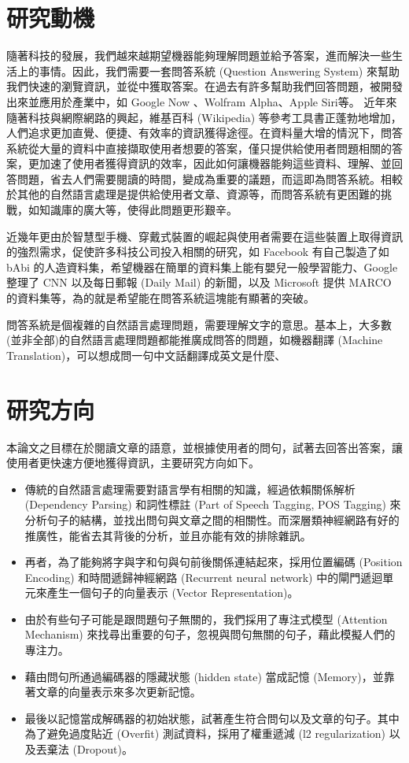 \section{研究動機}
隨著科技的發展，我們越來越期望機器能夠理解問題並給予答案，進而解決一些生活上的事情。因此，我們需要一套問答系統 (Question Answering System) 來幫助我們快速的瀏覽資訊，並從中獲取答案。在過去有許多幫助我們回答問題，被開發出來並應用於產業中，如 Google Now 、Wolfram Alpha、Apple Siri等。
近年來隨著科技與網際網路的興起，維基百科 (Wikipedia) 等參考工具書正蓬勃地增加，人們追求更加直覺、便捷、有效率的資訊獲得途徑。在資料量大增的情況下，問答系統從大量的資料中直接擷取使用者想要的答案，僅只提供給使用者問題相關的答案，更加速了使用者獲得資訊的效率，因此如何讓機器能夠這些資料、理解、並回答問題，省去人們需要閱讀的時間，變成為重要的議題，而這即為問答系統。相較於其他的自然語言處理是提供給使用者文章、資源等，而問答系統有更困難的挑戰，如知識庫的廣大等，使得此問題更形艱辛。

近幾年更由於智慧型手機、穿戴式裝置的崛起與使用者需要在這些裝置上取得資訊的強烈需求，促使許多科技公司投入相關的研究，如 Facebook 有自己製造了如 bAbi 的人造資料集，希望機器在簡單的資料集上能有嬰兒一般學習能力、Google 整理了 CNN 以及每日郵報 (Daily Mail) 的新聞，以及 Microsoft 提供 MARCO 的資料集等，為的就是希望能在問答系統這塊能有顯著的突破。

問答系統是個複雜的自然語言處理問題，需要理解文字的意思。基本上，大多數(並非全部)的自然語言處理問題都能推廣成問答的問題，如機器翻譯 (Machine Translation)，可以想成問一句中文話翻譯成英文是什麼、


\section{研究方向}
本論文之目標在於閱讀文章的語意，並根據使用者的問句，試著去回答出答案，讓使用者更快速方便地獲得資訊，主要研究方向如下。
\begin{itemize}
    \item 傳統的自然語言處理需要對語言學有相關的知識，經過依賴關係解析 (Dependency Parsing) 和詞性標註 (Part of Speech Tagging, POS Tagging) 來分析句子的結構，並找出問句與文章之間的相關性。而深層類神經網路有好的推廣性，能省去其背後的分析，並且亦能有效的排除雜訊。
    \item 再者，為了能夠將字與字和句與句前後關係連結起來，採用位置編碼 (Position Encoding) 和時間遞歸神經網路 (Recurrent neural network) 中的閘門遞迴單元來產生一個句子的向量表示 (Vector Representation)。
    \item 由於有些句子可能是跟問題句子無關的，我們採用了專注式模型 (Attention Mechanism) 來找尋出重要的句子，忽視與問句無關的句子，藉此模擬人們的專注力。
    \item 藉由問句所通過編碼器的隱藏狀態 (hidden state) 當成記憶 (Memory)，並靠著文章的向量表示來多次更新記憶。
    \item 最後以記憶當成解碼器的初始狀態，試著產生符合問句以及文章的句子。其中為了避免過度貼近 (Overfit) 測試資料，採用了權重遞減 (l2 regularization) 以及丟棄法 (Dropout)。
\end{itemize}

